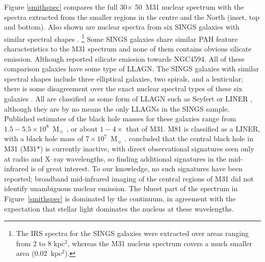 Figure \ref{smithspec} compares the full 30\arcsec $\times$ 50\arcsec\ M31 nuclear spectrum with the spectra extracted from the smaller regions in the centre and the North (inset, top and bottom). Also shown are nuclear spectra
from six SINGS galaxies with similar spectral shapes \citep{Smith:2007lr}.%
\footnote{The IRS spectra for the SINGS galaxies were extracted over areas ranging from 2 to 8 kpc$^2$, whereas the M31
nucleus spectrum covers a much smaller area (0.02~kpc$^2$).}
Some SINGS galaxies share similar PAH feature characteristics to the M31 spectrum and none of them contains obvious silicate emission. Although \citet{Mason2012} reported silicate emission towards NGC4594. 
All of these comparison galaxies have some type of LLAGN.
The SINGS galaxies with similar spectral shapes include  three elliptical galaxies, two spirals, and a lenticular; there is some disagreement over the
exact nuclear spectral types of these six galaxies \citep{kennicutt03,Smith:2007lr, moustakas2010}.  All are classified as some form of LLAGN
such as Seyfert or LINER \citep[luminous AGNs were intentionally omitted from the SINGS sample;][]{kennicutt03}, although they are
by no means the only LLAGNs in the SINGS sample.
Published estimates of the black hole masses for these galaxies range from $1.5-5.5\times10^{8}$~M$_{\sun}$
\citep[for NGC~1316 and NGC~4595, respectively]{nowak08, kormendy88}, or about $1-4\times$ that of M31.
M81 is classified as a LINER, with a black hole mass of $7\times10^7$~M$_{\sun}$ \citep{devereux03}.
\citet{Li09} concluded that the central black hole in M31 (M31*) is currently inactive, with direct observational signatures seen only
at radio and X--ray wavelengths, so finding additional signatures in the mid-infrared is of great interest.
To our knowledge, no such signatures have been reported; broadband mid-infrared imaging of the central 
regions of M31 \citep{davidge06,Barmby2006lr} did not identify unambiguous nuclear emission. The bluest
part of the spectrum in Figure~\ref{smithspec} is dominated by the continuum, in agreement with the
expectation that stellar light dominates the nucleus at these wavelengths.


